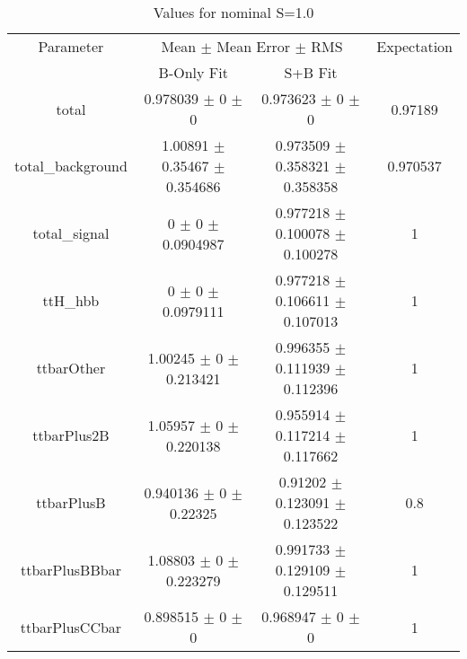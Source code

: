 \begin{table}
\centering
\caption{Values for nominal S=1.0}
\begin{tabular}{cccc}
\toprule
Parameter & \multicolumn{2}{c}{Mean $\pm$ Mean Error $\pm$ RMS} & Expectation\\
 & B-Only Fit & S+B Fit & \\
\midrule
total & \num{0.978039} $\pm$ \num{0} $\pm$ \num{0} & \num{0.973623} $\pm$ \num{0} $\pm$ \num{0} & \num{0.97189}\\
total\_background & \num{1.00891} $\pm$ \num{0.35467} $\pm$ \num{0.354686} & \num{0.973509} $\pm$ \num{0.358321} $\pm$ \num{0.358358} & \num{0.970537}\\
total\_signal & \num{0} $\pm$ \num{0} $\pm$ \num{0.0904987} & \num{0.977218} $\pm$ \num{0.100078} $\pm$ \num{0.100278} & \num{1}\\
ttH\_hbb & \num{0} $\pm$ \num{0} $\pm$ \num{0.0979111} & \num{0.977218} $\pm$ \num{0.106611} $\pm$ \num{0.107013} & \num{1}\\
ttbarOther & \num{1.00245} $\pm$ \num{0} $\pm$ \num{0.213421} & \num{0.996355} $\pm$ \num{0.111939} $\pm$ \num{0.112396} & \num{1}\\
ttbarPlus2B & \num{1.05957} $\pm$ \num{0} $\pm$ \num{0.220138} & \num{0.955914} $\pm$ \num{0.117214} $\pm$ \num{0.117662} & \num{1}\\
ttbarPlusB & \num{0.940136} $\pm$ \num{0} $\pm$ \num{0.22325} & \num{0.91202} $\pm$ \num{0.123091} $\pm$ \num{0.123522} & \num{0.8}\\
ttbarPlusBBbar & \num{1.08803} $\pm$ \num{0} $\pm$ \num{0.223279} & \num{0.991733} $\pm$ \num{0.129109} $\pm$ \num{0.129511} & \num{1}\\
ttbarPlusCCbar & \num{0.898515} $\pm$ \num{0} $\pm$ \num{0} & \num{0.968947} $\pm$ \num{0} $\pm$ \num{0} & \num{1}\\
\bottomrule
\end{tabular}
\end{table}